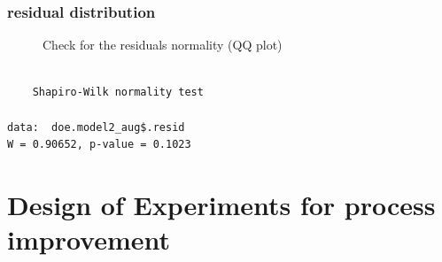 \documentclass[
  a4paper,
]{scrbook}
\newenvironment{Shaded}{\begin{snugshade}}{\end{snugshade}}
\newcommand{\FunctionTok}[1]{\textcolor[rgb]{0.28,0.35,0.67}{#1}}
\newcommand{\NormalTok}[1]{\textcolor[rgb]{0.00,0.23,0.31}{#1}}
\newcommand{\SpecialCharTok}[1]{\textcolor[rgb]{0.37,0.37,0.37}{#1}}
\begin{document}
\subsubsection{residual distribution}\label{residual-distribution}

\begin{figure}[ht]


\caption{\label{fig-pd-resid-qq}Check for the residuals normality (QQ
plot)}

\end{figure}%

\begin{Shaded}
\end{Shaded}

\begin{verbatim}

    Shapiro-Wilk normality test

data:  doe.model2_aug$.resid
W = 0.90652, p-value = 0.1023
\end{verbatim}

\section{Design of Experiments for process
improvement}\label{design-of-experiments-for-process-improvement}
\end{document}
